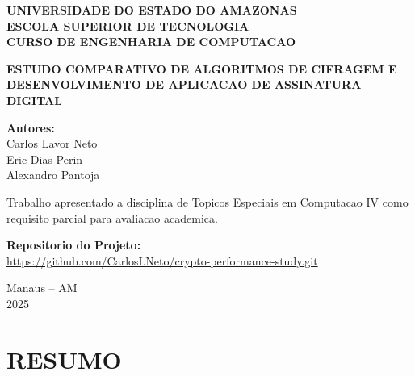 \documentclass[12pt,a4paper,oneside]{article}
\begin{document}
\begin{titlepage}
\centering
\vspace*{1cm}

{\fontsize{14}{16}\selectfont\bfseries\uppercase{Universidade do Estado do Amazonas}}\\
{\fontsize{14}{16}\selectfont\bfseries\uppercase{Escola Superior de Tecnologia}}\\
{\fontsize{14}{16}\selectfont\bfseries\uppercase{Curso de Engenharia de Computacao}}\\

\vspace{3cm}

{\fontsize{14}{16}\selectfont\bfseries\uppercase{Estudo Comparativo de Algoritmos de Cifragem e Desenvolvimento de Aplicacao de Assinatura Digital}}

\vspace{3cm}

{\fontsize{12}{14}\selectfont
\textbf{Autores:}\\
Carlos Lavor Neto\\
Eric Dias Perin\\
Alexandro Pantoja\\
}

\vspace{2cm}

{\fontsize{12}{14}\selectfont
Trabalho apresentado a disciplina de Topicos Especiais em Computacao IV como requisito parcial para avaliacao academica.

\vspace{0.5cm}
\textbf{Repositorio do Projeto:}\\
\url{https://github.com/CarlosLNeto/crypto-performance-study.git}
}

\vfill

{\fontsize{12}{14}\selectfont
Manaus -- AM\\
2025
}

\end{titlepage}

\newpage
\section*{RESUMO}
\end{document}
